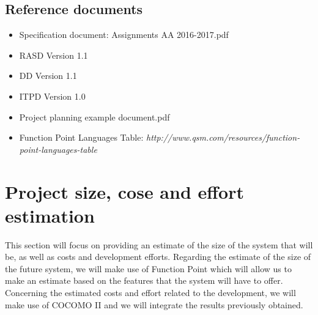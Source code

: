 \documentclass[10pt, a4paper,titlepage]{article}
\begin{document}
\subsection{Reference documents}
\begin{itemize}
\item Speciﬁcation document: Assignments AA 2016-2017.pdf
\item RASD Version 1.1    
\item DD Version 1.1
\item ITPD Version 1.0
\item Project planning example document.pdf
\item Function Point Languages Table: \emph{http://www.qsm.com/resources/function-point-languages-table}
\end{itemize}
\section{Project size, cose and effort estimation}
This section will focus on providing an estimate of the size of the system that will be, as well as costs and development efforts.
Regarding the estimate of the size of the future system, we will make use of Function Point which will allow us to make an estimate based on the features that the system will have to offer.
Concerning the estimated costs and effort related to the development, we will make use of COCOMO II and we will integrate the results previously obtained.
\end{document}
